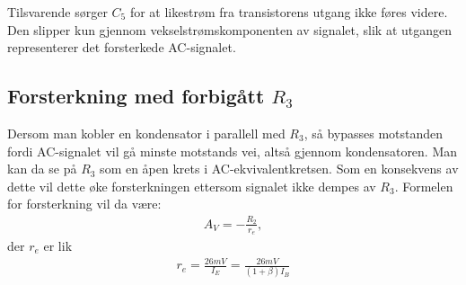             Tilsvarende sørger $C_5$ for at likestrøm fra transistorens utgang ikke føres videre. Den slipper kun gjennom vekselstrømskomponenten av signalet, slik at utgangen representerer det forsterkede AC-signalet.

        \subsection{Forsterkning med forbigått $R_3$}
            Dersom man kobler en kondensator i parallell med $R_3$, så bypasses motstanden fordi AC-signalet vil gå minste motstands vei, altså gjennom kondensatoren. Man kan da se på $R_3$ som en åpen krets i AC-ekvivalentkretsen.
            Som en konsekvens av dette vil dette øke forsterkningen ettersom signalet ikke dempes av $R_3$. Formelen for forsterkning vil da være:
            \begin{align*}
                A_V = -\frac{R_2}{r_e},
            \end{align*} 
            der $r_e$ er lik
            \begin{align*}
                r_e = \frac{26mV}{I_E} = \frac{26mV}{(1+\beta)I_B}
            \end{align*}

